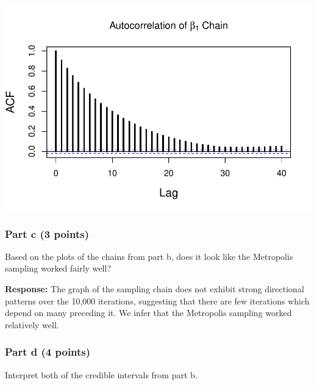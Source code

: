 \documentclass[
]{article}
\begin{document}
\includegraphics{Homework_6_files/figure-latex/prob4b-6.pdf}

\hypertarget{part-c-3-points-2}{%
\subsubsection{Part c (3 points)}\label{part-c-3-points-2}}

Based on the plots of the chains from part b, does it look like the
Metropolis sampling worked fairly well?

\textbf{Response:} The graph of the sampling chain does not exhibit
strong directional patterns over the 10,000 iterations, suggesting that
there are few iterations which depend on many preceding it. We infer
that the Metropolis sampling worked relatively well.

\hypertarget{part-d-4-points}{%
\subsubsection{Part d (4 points)}\label{part-d-4-points}}

Interpret both of the credible intervals from part b.
\end{document}
